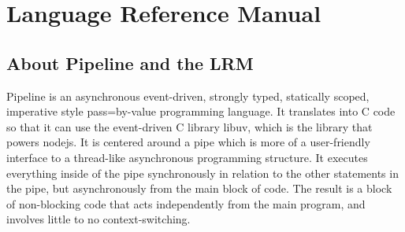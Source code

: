 \documentclass[./Report_main.tex]{subfiles}
\begin{document}


\chapter{Language Reference Manual}
\section{About Pipeline and the LRM}
Pipeline is an asynchronous event-driven, strongly typed, statically scoped, imperative style pass=by-value programming language. It translates into C code so that it can use the event-driven C library libuv, which is the library that powers nodejs. It is centered around a pipe which is more of a user-friendly interface to a thread-like asynchronous programming structure. It executes everything inside of the pipe synchronously in relation to the other statements in the pipe, but asynchronously from the main block of code. The result is a block of non-blocking code that acts independently from the main program, and involves little to no context-switching.
\end{document}
